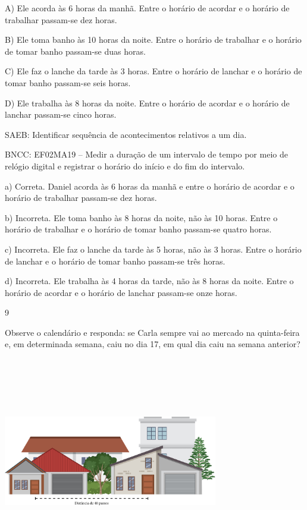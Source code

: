 \begin{escolha}
\begin{escolha}
{{{{A) Ele acorda às 6 horas da manhã. Entre o horário de acordar e o horário de trabalhar passam-se dez horas.

B) Ele toma banho às 10 horas da noite. Entre o horário de trabalhar e o horário de tomar banho passam-se duas horas.

C) Ele faz o lanche da tarde às 3 horas. Entre o horário de lanchar e o horário de tomar banho passam-se seis horas.

D) Ele trabalha às 8 horas da noite. Entre o horário de acordar e o horário de lanchar passam-se cinco horas.

SAEB: Identificar sequência de acontecimentos relativos a um dia.

BNCC: EF02MA19 -- Medir a duração de um intervalo de tempo por meio de
relógio digital e registrar o horário do início e do fim do intervalo.

a) Correta. Daniel acorda às 6 horas da manhã e entre o horário de acordar e o horário de trabalhar passam-se dez horas.

b) Incorreta. Ele toma banho às 8 horas da noite, não às 10 horas. Entre o horário de trabalhar e o horário de tomar banho passam-se quatro horas.

c) Incorreta. Ele faz o lanche da tarde às 5 horas, não às 3 horas. Entre o horário de lanchar e o horário de tomar banho passam-se três horas.

d) Incorreta. Ele trabalha às 4 horas da tarde, não às 8 horas da noite. Entre o horário de acordar e o horário de lanchar passam-se onze horas.

\num{9}

Observe o calendário e responda: se Carla sempre vai ao mercado na
quinta-feira e, em determinada semana, caiu no dia 17, em qual dia caiu na semana anterior?

\includegraphics[width=3.68590in,height=3.59375in]{media/image117.png}

}}}}
\end{escolha}
\end{escolha}
